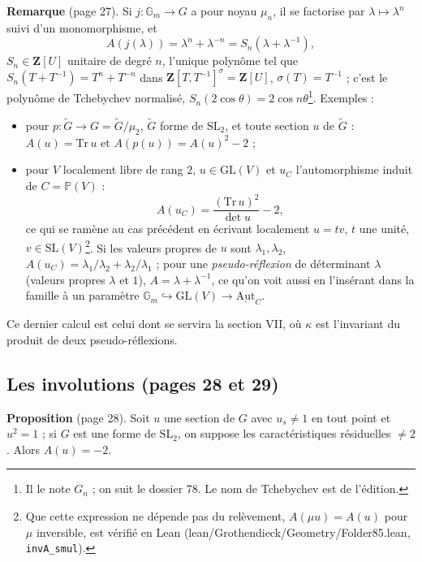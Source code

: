 \documentclass[11pt,a4paper]{article}
\begin{document}
\textbf{Remarque} (page 27). Si $j : \mathbb{G}_m \to G$ a pour noyau $\mu_n$,
il se factorise par $\lambda \mapsto \lambda^n$ suivi d'un monomorphisme, et
\[
  A(j(\lambda)) = \lambda^n + \lambda^{-n} = S_n(\lambda + \lambda^{-1}),
\]
$S_n \in \mathbf{Z}[U]$ unitaire de degré $n$, l'unique polynôme tel que
$S_n(T + T^{-1}) = T^n + T^{-n}$ dans $\mathbf{Z}[T, T^{-1}]^{\sigma} =
\mathbf{Z}[U]$, $\sigma(T) = T^{-1}$ ; c'est le polynôme de Tchebychev
normalisé, $S_n(2\cos\theta) = 2\cos n\theta$\footnote{Il le note $G_n$ ; on
suit le dossier 78. Le nom de Tchebychev est de l'édition.}. Exemples :
\begin{itemize}
  \item pour $p : \widetilde{G} \to G = \widetilde{G}/\mu_2$, $\widetilde{G}$
    forme de $\mathrm{SL}_2$, et toute section $u$ de $\widetilde{G}$ :
    $A(u) = \mathrm{Tr}\, u$ et $A(p(u)) = A(u)^2 - 2$ ;
  \item pour $V$ localement libre de rang $2$, $u \in \mathrm{GL}(V)$ et $u_C$
    l'automorphisme induit de $C = \mathbb{P}(V)$ :
    \[
      A(u_C) = \frac{(\mathrm{Tr}\, u)^2}{\det u} - 2 ,
    \]
    ce qui se ramène au cas précédent en écrivant localement $u = tv$, $t$ une
    unité, $v \in \mathrm{SL}(V)$\footnote{Que cette expression ne dépende
    pas du relèvement, $A(\mu u) = A(u)$ pour $\mu$ inversible, est vérifié
    en Lean (lean/Grothendieck/Geometry/Folder85.lean, \texttt{invA\_smul}).}. Si les valeurs propres de $u$ sont
    $\lambda_1, \lambda_2$, $A(u_C) = \lambda_1/\lambda_2 +
    \lambda_2/\lambda_1$ ; pour une \emph{pseudo-réflexion} de déterminant
    $\lambda$ (valeurs propres $\lambda$ et $1$), $A = \lambda +
    \lambda^{-1}$, ce qu'on voit aussi en l'insérant dans la famille à un
    paramètre $\mathbb{G}_m \hookrightarrow \mathrm{GL}(V) \to
    \underline{\mathrm{Aut}}_C$.
\end{itemize}
Ce dernier calcul est celui dont se servira la section VII, où $\kappa$ est
l'invariant du produit de deux pseudo-réflexions.

\subsection*{Les involutions (pages 28 et 29)}

\textbf{Proposition} (page 28). Soit $u$ une section de $G$ avec $u_s \neq 1$
en tout point et $u^2 = 1$ ; si $G$ est une forme de $\mathrm{SL}_2$, on
suppose les caractéristiques résiduelles $\neq 2$. Alors $A(u) = -2$.
\end{document}
